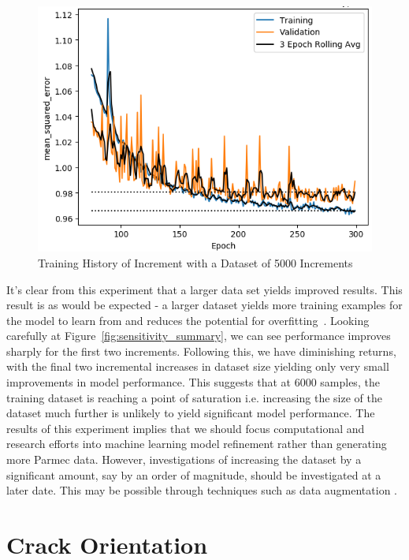 \begin{figure}[b]
	\centering
	\includegraphics[scale=0.75]{Figures/TrainHistory_dataset_cases5000_C0_321_L0_13_0_321_0_13_48_1_allI0.png}
	\caption{Training History of Increment with a Dataset of 5000 Increments}
	\label{fig:history_5000}
\end{figure}

\noindent
It's clear from this experiment that a larger data set yields improved results. This result is as would be expected - a larger dataset yields more training examples for the model to learn from and reduces the potential for overfitting~\cite{hawkins2004problem}.  Looking carefully at Figure~\ref{fig:sensitivity_summary}, we can see performance improves sharply for the first two increments. Following this, we have diminishing returns, with the final two incremental increases in dataset size yielding only very small improvements in model performance.  This suggests that at 6000 samples,  the training dataset is reaching a point of saturation i.e. increasing the size of the dataset much further is unlikely to yield significant model performance. The results of this experiment implies that we should focus computational and research efforts into machine learning model refinement rather than generating more Parmec data. However, investigations of increasing the dataset by a significant amount, say by an order of magnitude, should be investigated at a later date. This may be possible through techniques such as data augmentation \cite{shorten2019survey}.


\section{Crack Orientation}


